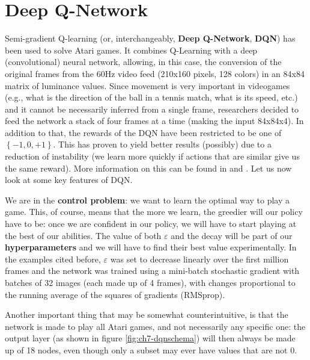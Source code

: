 \section{Deep Q-Network}
Semi-gradient Q-learning (or, interchangeably, \textbf{Deep Q-Network}, \textbf{DQN}) has been used to solve Atari games. It combines Q-Learning with a deep (convolutional) neural network, allowing, in this case, the conversion of the original frames from the 60Hz video feed (210x160 pixels, 128 colors) in an 84x84 matrix of luminance values. Since movement is very important in videogames (e.g., what is the direction of the ball in a tennis match, what is its speed, etc.) and it cannot be necessarily inferred from a single frame, researchers decided to feed the network a stack of four frames at a time (making the input 84x84x4). In addition to that, the rewards of the DQN have been restricted to be one of $\left\{-1,0,+1\right\}$. This has proven to yield better results (possibly) due to a reduction of instability (we learn more quickly if actions that are similar give us the same reward). More information on this can be found in \cite{mnih2013atari} and \cite{mnih2015humanlevel}. Let us now look at some key features of DQN.

We are in the \textbf{control problem}: we want to learn the optimal way to play a game. This, of course, means that the more we learn, the greedier will our policy have to be: once we are confident in our policy, we will have to start playing at the best of our abilities. The value of both $\varepsilon$ and the decay will be part of our \textbf{hyperparameters} and we will have to find their best value experimentally. In the examples cited before, $\varepsilon$ was set to decrease linearly over the first million frames and the network was trained using a mini-batch stochastic gradient with batches of 32 images (each made up of 4 frames), with changes proportional to the running average of the squares of gradients (RMSprop).

Another important thing that may be somewhat counterintuitive, is that the network is made to play all Atari games, and not necessarily any specific one: the output layer (as shown in figure \ref{fig:ch7-dqnschema}) will then always be made up of 18 nodes, even though only a subset may ever have values that are not 0.

